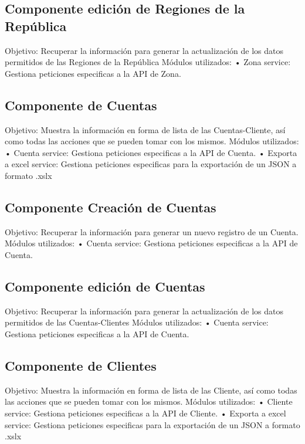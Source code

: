 \subsection{Componente edición de Regiones de la República}
Objetivo: Recuperar la información para generar la actualización de los datos permitidos de las Regiones de la República
\newline
Módulos utilizados: 
\newline
• Zona service: Gestiona peticiones especificas a la API de Zona.


\subsection{Componente de Cuentas}
Objetivo: Muestra la información en forma de lista de las Cuentas-Cliente, así como todas las acciones que se pueden tomar con los mismos.
\newline
Módulos utilizados: 
\newline
• Cuenta service: Gestiona peticiones especificas a la API de Cuenta.
\newline
• Exporta a excel service: Gestiona peticiones especificas para la exportación de un JSON a formato .xslx

\subsection{Componente  Creación de Cuentas}
Objetivo: Recuperar la información para generar un nuevo registro de un Cuenta.
\newline
Módulos utilizados: 
\newline
• Cuenta service: Gestiona peticiones especificas a la API de Cuenta.

\subsection{Componente edición de  Cuentas}
Objetivo: Recuperar la información para generar la actualización de los datos permitidos de las  Cuentas-Clientes 
\newline
Módulos utilizados: 
\newline
• Cuenta service: Gestiona peticiones especificas a la API de Cuenta.

\subsection{Componente de Clientes}
Objetivo: Muestra la información en forma de lista de las Cliente, así como todas las acciones que se pueden tomar con los mismos.
\newline
Módulos utilizados: 
\newline
• Cliente service: Gestiona peticiones especificas a la API de Cliente.
\newline
• Exporta a excel service: Gestiona peticiones especificas para la exportación de un JSON a formato .xslx


